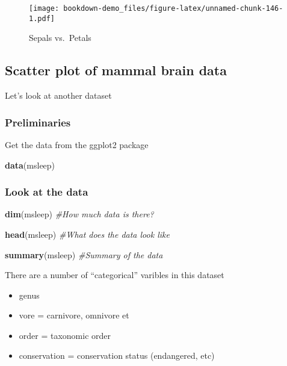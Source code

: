 \documentclass[]{book}
\newenvironment{Shaded}{\begin{snugshade}}{\end{snugshade}}
\newcommand{\KeywordTok}[1]{\textcolor[rgb]{0.13,0.29,0.53}{\textbf{#1}}}
\newcommand{\CommentTok}[1]{\textcolor[rgb]{0.56,0.35,0.01}{\textit{#1}}}
\newcommand{\NormalTok}[1]{#1}
\providecommand{\tightlist}{%
  \setlength{\itemsep}{0pt}\setlength{\parskip}{0pt}}
\theoremstyle{definition}
\theoremstyle{definition}
\theoremstyle{definition}
\theoremstyle{remark}
\begin{document}
\begin{figure}
\centering
\texttt{[image: bookdown-demo\_files/figure-latex/unnamed-chunk-146-1.pdf]}
\caption{\label{fig:unnamed-chunk-146}Sepals vs.~Petals}
\end{figure}

\subsection{Scatter plot of mammal brain
data}\label{scatter-plot-of-mammal-brain-data}

Let's look at another dataset

\subsubsection{Preliminaries}\label{preliminaries}

Get the data from the ggplot2 package

\begin{Shaded}
\begin{Highlighting}[]
\KeywordTok{data}\NormalTok{(msleep)}
\end{Highlighting}
\end{Shaded}

\subsubsection{Look at the data}\label{look-at-the-data}

\begin{Shaded}
\begin{Highlighting}[]
\KeywordTok{dim}\NormalTok{(msleep) }\CommentTok{#How much data is there?}

\KeywordTok{head}\NormalTok{(msleep) }\CommentTok{#What does the data look like}

\KeywordTok{summary}\NormalTok{(msleep) }\CommentTok{#Summary of the data}
\end{Highlighting}
\end{Shaded}

There are a number of ``categorical'' varibles in this dataset

\begin{itemize}
\tightlist
\item
  genus
\item
  vore = carnivore, omnivore et
\item
  order = taxonomic order
\item
  conservation = conservation status (endangered, etc)
\end{itemize}
\end{document}
